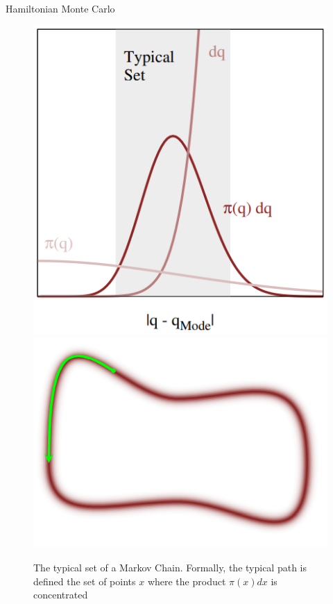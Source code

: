 \documentclass[10pt]{beamer}
\begin{document}
\begin{frame}[allowframebreaks]{Hamiltonian Monte Carlo}
    \begin{figure}
        \centering
        \includegraphics[width=0.5\textheight]{publications/presentations/log_concave_sampling/typical_1.png} \quad
        \includegraphics[width=0.5\textheight]{publications/presentations/log_concave_sampling/typical_path.png}
        \caption{The typical set of a Markov Chain. Formally, the typical path is defined the set of points $x$ where the product $\pi(x) dx $ is concentrated  }
        \label{fig:my_label}
    \end{figure}
    

\end{frame}
\end{document}
